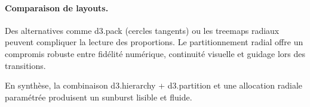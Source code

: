 \paragraph{Comparaison de layouts.} Des alternatives comme d3.pack (cercles tangents) ou les treemaps radiaux peuvent compliquer la lecture des proportions. Le partitionnement radial offre un compromis robuste entre fidélité numérique, continuité visuelle et guidage lors des transitions.

En synthèse, la combinaison d3.hierarchy + d3.partition et une allocation radiale paramétrée produisent un sunburst lisible et fluide.
